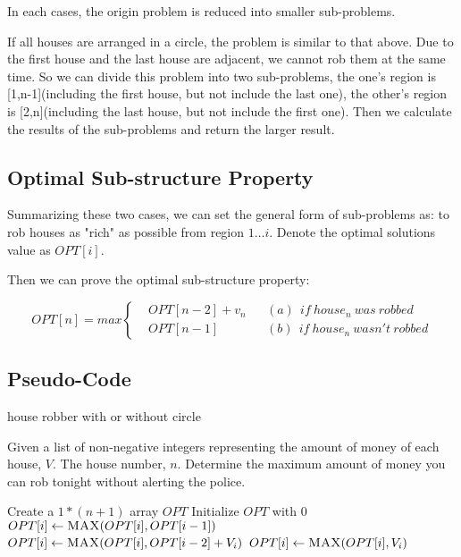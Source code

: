 \documentclass[UTF8,a4paper,12pt]{article}
\begin{document}
\begin{CJK}{UTF8}{gkai}
		In each cases, the origin problem is reduced into smaller sub-problems.
	
		If all houses are arranged in a circle, the problem is similar to that above. Due to the first house and the last house are adjacent, we cannot rob them at the same time. So we can divide this problem into two sub-problems, the one's region is [1,n-1](including the first house, but not include the last one), the other's region is [2,n](including the last house, but not include the first one). Then we calculate the results of the sub-problems and return the larger result.

	\subsection{Optimal Sub-structure Property}
	
		Summarizing these two cases, we can set the general form of sub-problems as: to rob houses as "rich" as possible from region $ 1 \dots i $. Denote the optimal solutions value as $ OPT[i] $. 

		Then we can prove the optimal sub-structure property:
	
		$$ OPT[n] = max \left\{
		\begin{aligned}
			& OPT[n-2] + v_{n} &&(a)\ \ if\  house_{n}\ was\ robbed\\
			& OPT[n-1]	&&(b)\ \ if\ house_{n}\ wasn't\ robbed
		\end{aligned}
		\right.
		$$


	\subsection{Pseudo-Code}
	
	\begin{algorithm}[htb]
		\caption{house robber with or without circle}
		\begin{algorithmic}[1]
			\Require
			Given a list of non-negative integers representing the amount of money of each house, $ V $.
			The house number, $ n $.
			\Ensure
			Determine the maximum amount of money you can rob tonight without alerting the police.
			
				\State Create a $ 1*(n+1) $ array $ OPT $
				\State Initialize $ OPT $ with 0
					\State $ OPT[i] \gets \Call{MAX}{OPT[i],OPT[i-1]} $
						\State $ OPT[i] \gets \Call{MAX}{OPT[i],OPT[i-2]+V_{i}} $
					\Else
						\State $ OPT[i] \gets \Call{MAX}{OPT[i],V_{i}} $
					\EndIf
				\EndFor
				\State {}
			\EndFunction
			\State
			

\end{algorithmic}
\end{algorithm}
\end{CJK}
\end{document}
